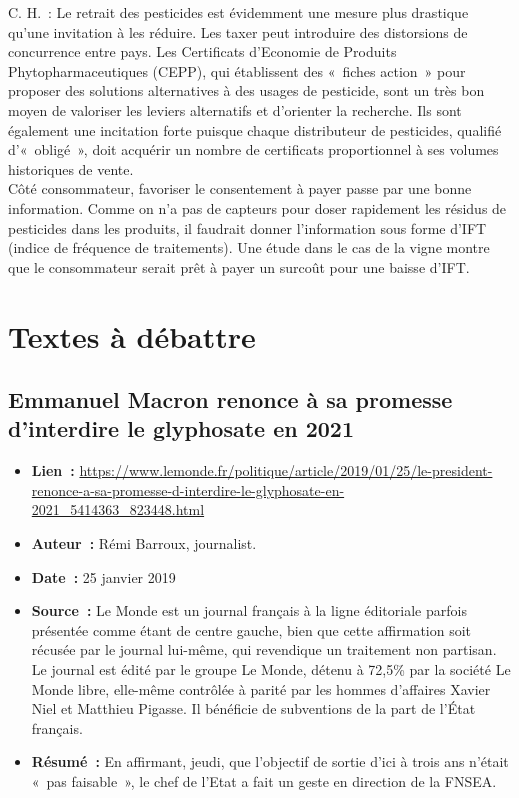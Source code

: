 \documentclass[8pt]{article}
\begin{document}
C. H.~: Le retrait des pesticides est évidemment une mesure plus drastique qu’une invitation à les réduire.
Les taxer peut introduire des distorsions de concurrence entre pays.
Les Certificats d’Economie de Produits Phytopharmaceutiques (CEPP), qui établissent des «~fiches action~» pour proposer des solutions alternatives à des usages de pesticide, sont un très bon moyen de valoriser les leviers alternatifs et d’orienter la recherche. Ils sont également une incitation forte puisque chaque distributeur de pesticides, qualifié d’«~obligé~», doit acquérir un nombre de certificats proportionnel à ses volumes historiques de vente.\\

Côté consommateur, favoriser le consentement à payer passe par une bonne information. Comme on n’a pas de capteurs pour doser rapidement les résidus de pesticides dans les produits, il faudrait donner l’information sous forme d’IFT (indice de fréquence de traitements). Une étude dans le cas de la vigne montre que le consommateur serait prêt à payer un surcoût pour une baisse d’IFT.

\newpage
\section{Textes à débattre}
\subsection{Emmanuel Macron renonce à sa promesse d’interdire le glyphosate en 2021}
\label{sec:interdiction}

\begin{itemize}
	\item \textbf{Lien~: }  \url{https://www.lemonde.fr/politique/article/2019/01/25/le-president-renonce-a-sa-promesse-d-interdire-le-glyphosate-en-2021_5414363_823448.html} 
	\item \textbf{Auteur~: }  Rémi Barroux, journalist.
	\item \textbf{Date~: }25 janvier 2019
	\item \textbf{Source~: } Le Monde est un journal  français à la ligne éditoriale parfois présentée comme étant de centre gauche, bien que cette affirmation soit récusée par le journal lui-même, qui revendique un traitement non partisan. Le journal est édité par le groupe Le Monde, détenu à 72,5\% par la société Le Monde libre, elle-même contrôlée à parité par les hommes d'affaires Xavier Niel et Matthieu Pigasse. Il bénéficie de subventions de la part de l'État français. 
	\item \textbf{Résumé~: } En affirmant, jeudi, que l’objectif de sortie d’ici à trois ans n’était «~pas faisable~», le chef de l’Etat a fait un geste en direction de la FNSEA. 
\end{itemize}
\end{document}
